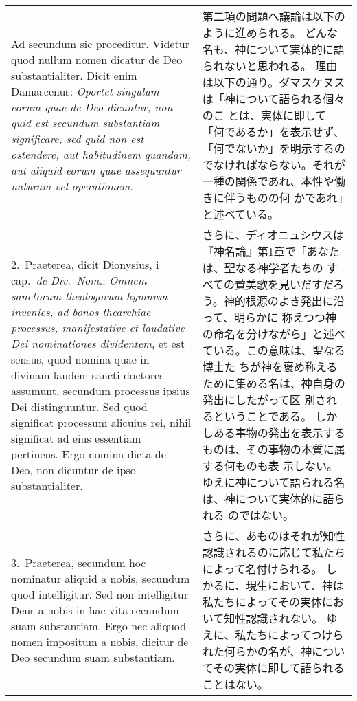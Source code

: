 \documentclass[10pt]{jsarticle} %
\begin{document}
\begin{longtable}{p{21em}p{21em}}

{\sc Ad secundum sic proceditur}. Videtur quod nullum nomen
dicatur de Deo substantialiter. Dicit enim Damascenus: {\it Oportet singulum
eorum quae de Deo dicuntur, non quid est secundum substantiam
significare, sed quid non est ostendere, aut habitudinem quandam, aut
aliquid eorum quae assequuntur naturam vel operationem}.


&

第二項の問題へ議論は以下のように進められる。
どんな名も、神について実体的に語られないと思われる。
理由は以下の通り。ダマスケヌスは「神について語られる個々のこ
 とは、実体に即して「何であるか」を表示せず、「何でないか」を明示するの
 でなければならない。それが一種の関係であれ、本性や働きに伴うものの何
 かであれ」と述べている。



\\

2.~{\sc Praeterea}, dicit Dionysius, {\sc i} cap.\ {\it de Div.\
Nom.}: {\it Omnem sanctorum theologorum hymnum invenies, ad bonos
thearchiae processus, manifestative et laudative Dei nominationes
dividentem}, et est sensus, quod nomina quae in divinam laudem sancti
doctores assumunt, secundum processus ipsius Dei distinguuntur. Sed quod
significat processum alicuius rei, nihil significat ad eius essentiam
pertinens. Ergo nomina dicta de Deo, non dicuntur de ipso
substantialiter.

&

さらに、ディオニュシウスは『神名論』第1章で「あなたは、聖なる神学者たちの
 すべての賛美歌を見いだすだろう。神的根源のよき発出に沿って、明らかに
 称えつつ神の命名を分けながら」と述べている。この意味は、聖なる博士た
 ちが神を褒め称えるために集める名は、神自身の発出にしたがって区
 別されるということである。
しかしある事物の発出を表示するものは、その事物の本質に属する何ものも表
 示しない。ゆえに神について語られる名は、神について実体的に語られる
 のではない。

\\

3.~{\sc Praeterea}, secundum hoc nominatur aliquid a nobis,
secundum quod intelligitur. Sed non intelligitur Deus a nobis in hac
vita secundum suam substantiam. Ergo nec aliquod nomen impositum a
nobis, dicitur de Deo secundum suam substantiam.

&

さらに、あものはそれが知性認識されるのに応じて私たちによって名付けられる。
しかるに、現生において、神は私たちによってその実体において知性認識されない。
ゆえに、私たちによってつけられた何らかの名が、神についてその実体に即して語られることはない。


\end{longtable}
\end{document}
